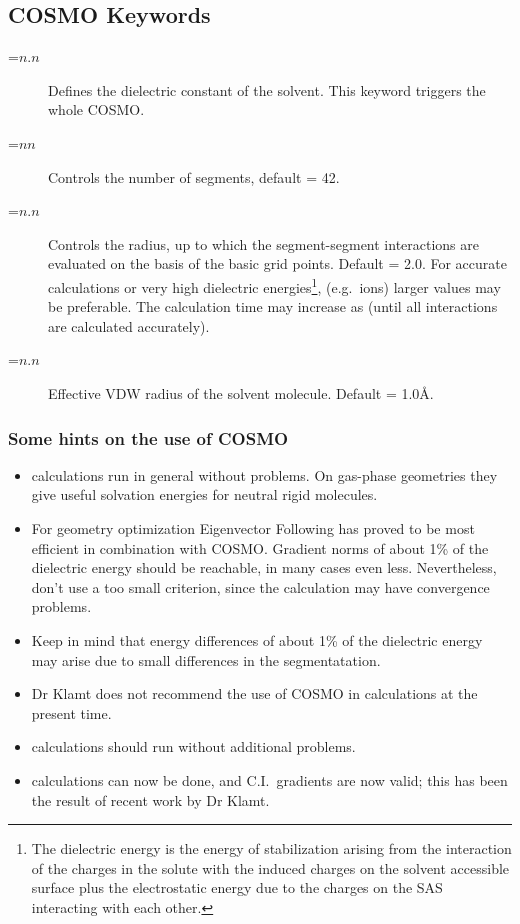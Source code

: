 \subsection{COSMO Keywords}
\begin{description}
\item[=$n.n$] Defines the dielectric constant of the solvent.   This
keyword triggers the whole COSMO.
\item[=$nn$] Controls the number of segments, default = 42.
\item[=$n.n$] Controls the radius, up to which the segment-segment
interactions are evaluated on the basis of the basic grid points.  Default =
2.0.  For accurate calculations or very high  dielectric
energies\footnote{\samepage The dielectric energy is the energy of
stabilization arising from the  interaction of the charges in the solute with
the induced charges on the  solvent accessible surface plus the electrostatic
energy due to the charges on the SAS interacting with each other.}, (e.g.\
ions) larger values may be preferable.  The calculation time may increase  as  
\comp{DISEX$^2$}  (until all interactions are calculated accurately).
\item[\comp{RSOLV}=$n.n$] Effective VDW radius of the solvent molecule. 
Default = 1.0\AA .
\end{description}


\subsubsection{Some hints on the use of COSMO}
\begin{itemize}
\item {} calculations run in general without problems. On  gas-phase
geometries they give useful solvation energies for  neutral rigid molecules.
\item For geometry optimization Eigenvector Following has proved to be most
efficient in combination with COSMO. Gradient norms of about 1\% of the
dielectric energy should be reachable, in many cases even less. Nevertheless,
don't use a too small \comp{GNORM} criterion, since the calculation may have
convergence problems.
\item Keep in mind that energy differences of about 1\% of the dielectric
energy may arise due to small differences in the segmentatation.
\item Dr Klamt does not recommend the use of COSMO in  calculations
at the present time.
\item {} calculations should run without additional problems.
\item \comp{C.I.} calculations can now be done, and C.I.\ gradients are now 
valid; this has been the result of recent work by Dr Klamt.
\end{itemize}
